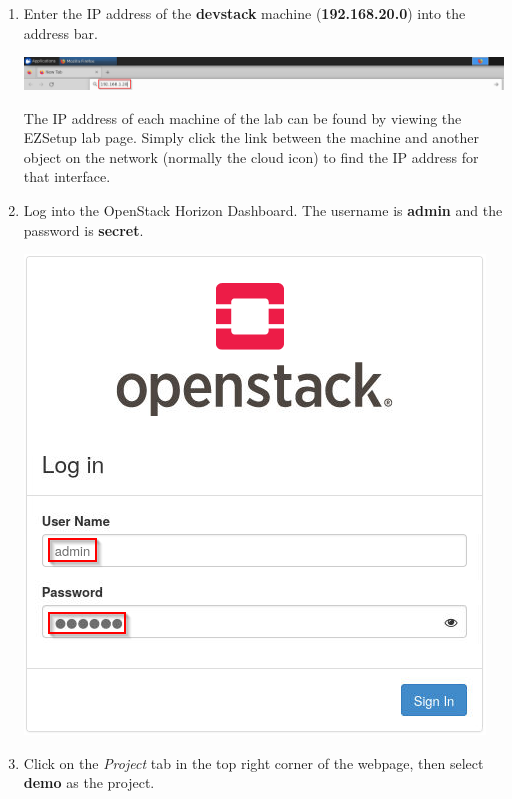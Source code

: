 \documentclass[letterpaper, 12pt]{article}
\begin{document}
\begin{enumerate}
    \item Enter the IP address of the \textbf{devstack} machine (\textbf{192.168.20.0}) into the address bar.
    
    \begin{center}
        \includegraphics[width=\linewidth]{images/part_1_step_6.png}
    \end{center}

    \begin{tipbox}{}
        The IP address of each machine of the lab can be found by viewing the EZSetup lab page. Simply click the link
        between the machine and another object on the network (normally the cloud icon) to find the IP address for that
        interface.
    \end{tipbox}

    \item Log into the OpenStack Horizon Dashboard. The username is \textbf{admin} and the password is \textbf{secret}.
    
    \begin{center}
        \includegraphics[scale=0.75]{images/part_1_step_7.png}
    \end{center}

    \item Click on the \textit{Project} tab in the top right corner of the webpage, then select \textbf{demo} as the
    project.


\end{enumerate}
\end{document}

